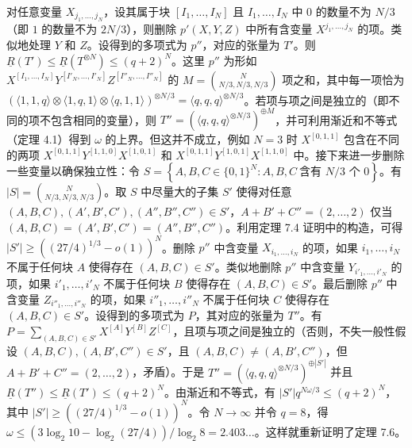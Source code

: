 \documentclass[11pt,fleqn, UTF8]{ctexbook} %
\begin{document}
对任意变量 $X_{j_1,\dots,j_N}$，设其属于块 $[I_1,\dots,I_N]$ 且 $I_1,\dots,I_N$ 中 $0$ 的数量不为 $N/3$（即 $1$ 的数量不为 $2N/3$），则删除 $p'(X,Y,Z)$ 中所有含变量 $X^{j_1,\dots,j_N}$ 的项。类似地处理 $Y$ 和 $Z$。设得到的多项式为 $p''$，对应的张量为 $T'$。则 $\underline{R}(T')\leq \underline{R}\left(T^{\otimes N}\right)\leq (q+2)^N$。这里 $p''$ 为形如 $X^{[I_1,\dots,I_N]}Y^{[I'_N,\dots,I'_N]}Z^{[I''_N,\dots,I''_N]}$ 的 $M={N\choose N/3,N/3,N/3}$ 项之和，其中每一项恰为 $(\langle 1,1,q\rangle\otimes\langle 1,q,1\rangle\otimes\langle q,1,1\rangle)^{\otimes N/3}=\langle q,q,q\rangle^{\otimes N/3}$。若项与项之间是独立的（即不同的项不包含相同的变量），则 $T''=\left(\langle q,q,q\rangle^{\otimes N/3}\right)^{\oplus M}$，并可利用渐近和不等式（定理 4.1）得到 $\omega$ 的上界。但这并不成立，例如 $N=3$ 时 $X^{[0,1,1]}$ 包含在不同的两项 $X^{[0,1,1]}Y^{[1,1,0]}X^{[1,0,1]}$ 和 $X^{[0,1,1]}Y^{[1,0,1]}X^{[1,1,0]}$ 中。接下来进一步删除一些变量以确保独立性：令 $S=\left\{A,B,C\in \{0,1\}^N: A,B,C ~\text{含有 } N/3 \text{ 个 } 0 \right\}$。有 $|S|={N\choose N/3,N/3,N/3}$。取 $S$ 中尽量大的子集 $S'$ 使得对任意 $(A,B,C),(A',B',C'),(A'',B'',C'')\in S'$，$A+B'+C''=(2,\dots,2)$ 仅当 $(A,B,C)=(A',B',C')=(A'',B'',C'')$。利用定理 7.4 证明中的构造，可得 $|S'|\geq ((27/4)^{1/3}-o(1))^N$。删除 $p''$ 中含变量 $X_{i_1,\dots,i_N}$ 的项，如果 ${i_1,\dots,i_N}$ 不属于任何块 $A$ 使得存在 $(A,B,C)\in S'$。类似地删除 $p''$ 中含变量 $Y_{i'_1,\dots,i'_N}$ 的项，如果 ${i'_1,\dots,i'_N}$ 不属于任何块 $B$ 使得存在 $(A,B,C)\in S'$。最后删除 $p''$ 中含变量 $Z_{i''_1,\dots,i''_N}$ 的项，如果 ${i''_1,\dots,i''_N}$ 不属于任何块 $C$ 使得存在 $(A,B,C)\in S'$。设得到的多项式为 $P$，其对应的张量为 $T''$。有 $P=\sum_{(A,B,C)\in S'} X^{[A]}Y^{[B]}Z^{[C]}$，且项与项之间是独立的（否则，不失一般性假设 $(A,B,C),(A,B',C'')\in S'$，且 $(A,B,C)\neq (A,B',C'')$，但 $A+B'+C''=(2,\dots,2)$，矛盾）。于是 $T''=\left(\langle q,q,q\rangle^{\otimes N/3}\right)^{\oplus |S'|}$ 并且 $\underline{R}(T'')\leq \underline{R}(T')\leq (q+2)^N$。由渐近和不等式，有 $|S'|q^{N\omega/3}\leq (q+2)^N$，其中 $|S'|\geq ((27/4)^{1/3}-o(1))^N$。令 $N\to\infty$ 并令 $q=8$，得 $\omega \leq (3\log_2 10 - \log_2 (27/4)) / \log_2 8=2.403\dots$。这样就重新证明了定理 7.6。
\end{document}
